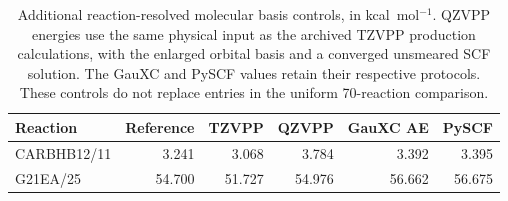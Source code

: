 \begin{table}[htbp]
\centering\small
\caption{Additional reaction-resolved molecular basis controls, in kcal~mol$^{-1}$. QZVPP energies use the same physical input as the archived TZVPP production calculations, with the enlarged orbital basis and a converged unsmeared SCF solution. The GauXC and PySCF values retain their respective protocols. These controls do not replace entries in the uniform 70-reaction comparison.}
\label{tab:molecular-additional-basis}
\begin{tabular}{lrrrrr}
\toprule
Reaction & Reference & TZVPP & QZVPP & GauXC AE & PySCF\\
\midrule
CARBHB12/11 & 3.241 & 3.068 & 3.784 & 3.392 & 3.395\\
G21EA/25 & 54.700 & 51.727 & 54.976 & 56.662 & 56.675\\
\bottomrule
\end{tabular}
\end{table}
